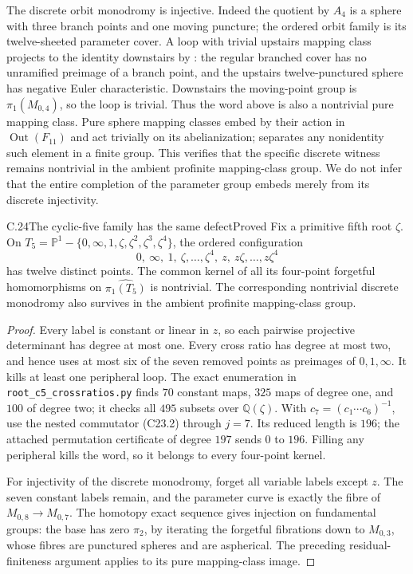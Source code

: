 The discrete orbit monodromy is injective. Indeed the quotient by $A_4$
is a sphere with three branch points and one moving puncture; the
ordered orbit family is its twelve-sheeted parameter cover. A loop
with trivial upstairs mapping class projects to the identity downstairs
by \citet[Theorem 1.1]{Winarski2015}: the regular branched cover has no
unramified preimage of a branch point, and the upstairs twelve-punctured
sphere has negative Euler characteristic. Downstairs the moving-point
group is $\pi_1(M_{0,4})$, so the loop is trivial. Thus the word above
is also a nontrivial pure mapping class. Pure sphere mapping classes
embed by their action in $\operatorname{Out}(F_{11})$ and act trivially
on its abelianization; \citet[Theorem 1.4]{Paris2009} separates any
nonidentity such element in a finite group. This verifies that the
specific discrete witness remains nontrivial in the ambient profinite
mapping-class group. We do not infer that the entire completion of the
parameter group embeds merely from its discrete injectivity.

\begin{statement}{C.24}{The cyclic-five family has the same defect}{Proved}
Fix a primitive fifth root $\zeta$. On
$T_5=\mathbb P^1-\{0,\infty,1,\zeta,\zeta^2,\zeta^3,\zeta^4\}$,
the ordered configuration
\[
 0,\ \infty,\ 1,\ \zeta,\ldots,\zeta^4,
 \ z,\ z\zeta,\ldots,z\zeta^4
\]
has twelve distinct points. The common kernel of all its four-point
forgetful homomorphisms on $\widehat{\pi_1(T_5)}$ is nontrivial.
The corresponding nontrivial discrete monodromy also survives in the
ambient profinite mapping-class group.
\end{statement}
\begin{proof}
Every label is constant or linear in $z$, so each pairwise projective
determinant has degree at most one. Every cross ratio has degree at
most two, and hence uses at most six of the seven removed points as
preimages of $0,1,\infty$. It kills at least one peripheral loop.
The exact enumeration in \texttt{root\_c5\_crossratios.py} finds
$70$ constant maps, $325$ maps of degree one, and $100$ of degree two;
it checks all $495$ subsets over $\mathbb Q(\zeta)$.
With $c_7=(c_1\cdots c_6)^{-1}$, use the nested commutator (C23.2)
through $j=7$. Its reduced length is $196$; the attached permutation
certificate of degree $197$ sends $0$ to $196$. Filling any peripheral
kills the word, so it belongs to every four-point kernel.

For injectivity of the discrete monodromy, forget all variable labels
except $z$. The seven constant labels remain, and the parameter curve
is exactly the fibre of $M_{0,8}\to M_{0,7}$. The homotopy exact
sequence gives injection on fundamental groups: the base has zero
$\pi_2$, by iterating the forgetful fibrations down to $M_{0,3}$,
whose fibres are punctured spheres and are aspherical. The preceding
residual-finiteness argument applies to its pure mapping-class image.
\end{proof}

